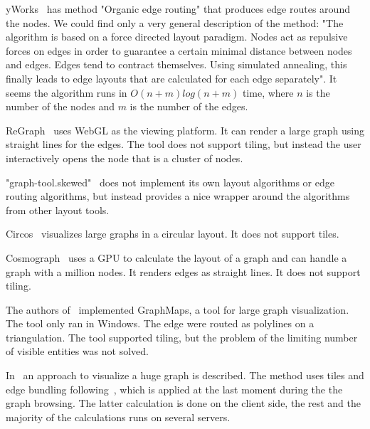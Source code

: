 \documentclass{gd-llncs}
\begin{document}
yWorks~\cite{yworks} has method "Organic edge routing" that produces edge
routes around the nodes. We could find only
a very general description of the method: "The algorithm is based on a force
directed layout paradigm. Nodes act as repulsive forces on edges in order to
guarantee a certain minimal distance between nodes and edges. Edges tend to contract
themselves. Using simulated annealing, this finally leads to edge layouts that
are calculated for each edge separately". It seems the algorithm runs in $O(n+m)log(n+m)$
time, where $n$ is the number of the nodes and $m$ is the number of the edges.

ReGraph~\cite{regraph} uses WebGL as the viewing platform. It can render a large
graph using straight lines for the edges. The tool does not support tiling, but instead
the user interactively opens the node that is a cluster of nodes.

"graph-tool.skewed"~\cite{skewed} does not implement its own layout algorithms or
edge routing algorithms, but instead provides a nice wrapper around the algorithms from
other layout tools.

Circos~\cite{circos} visualizes large graphs in a circular layout. It does not support tiles.


Cosmograph~\cite{cosmograph} uses a GPU to calculate the layout of a graph and can
handle a graph with a million nodes. It renders edges as straight lines.
It does not support tiling.

The authors of~\cite{nachmanson2015graphmaps} implemented GraphMaps, a tool for large graph visualization. 
The tool only ran in Windows. The edge were routed as polylines on a triangulation. 
The tool supported tiling, but the problem of the limiting number of visible entities was not solved.

In~\cite{perrot2018cornac} an approach to visualize a huge graph is described. The method uses tiles and
edge bundling following~\cite{hurter2012graph}, which is applied at the last moment during the the graph browsing.
The latter calculation is done on the client side, the rest and the majority of the calculations runs on several servers.
\end{document}
